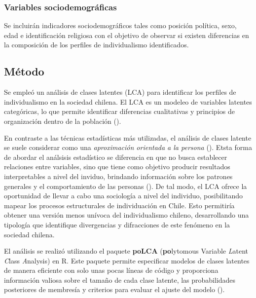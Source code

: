 \documentclass[
  letterpaper,
  DIV=11,
  numbers=noendperiod]{scrartcl}
\begin{document}
\endgroup{}

\subsubsection{Variables
sociodemográficas}\label{variables-sociodemogruxe1ficas}

Se incluirán indicadores sociodemográficos tales como posición política,
sexo, edad e identificación religiosa con el objetivo de observar si
existen diferencias en la composición de los perfiles de individualismo
identificados.

\subsection{Método}\label{muxe9todo}

Se empleó un análisis de clases latentes (LCA) para identificar los
perfiles de individualismo en la sociedad chilena. El LCA es un modeleo
de variables latentes categóricas, lo que permite identificar
diferencias cualitativas y principios de organización dentro de la
población ().

En contraste a las técnicas estadísticas más utilizadas, el análisis de
clases latente se suele considerar como una \emph{aproximación orientada
a la persona} (). Etsta
forma de abordar el análsisis estadístico se diferencia en que no busca
establecer relaciones entre variables, sino que tiene como objetivo
producir resultados interpretables a nivel del inviduo, brindando
información sobre los patrones generales y el comportamiento de las
personas (). De tal
modo, el LCA ofrece la oportunidad de llevar a cabo una sociología a
nivel del individuo, posibilitando mapear los procesos estructurales de
individuación en Chile. Esto permitiría obtener una versión menos
unívoca del individualismo chileno, desarrollando una tipología que
identifique divergencias y difracciones de este fenómeno en la sociedad
chilena.

El análisis se realizó utilizando el paquete \textbf{poLCA}
(\textbf{po}lytomous Variable \emph{L}atent \emph{C}lass
\emph{A}nalysis) en R. Este paquete permite especificar modelos de
clases latentes de manera eficiente con solo unas pocas líneas de código
y proporciona información valiosa sobre el tamaño de cada clase latente,
las probabilidades posteriores de membresía y criterios para evaluar el
ajuste del modelo ().
\end{document}
